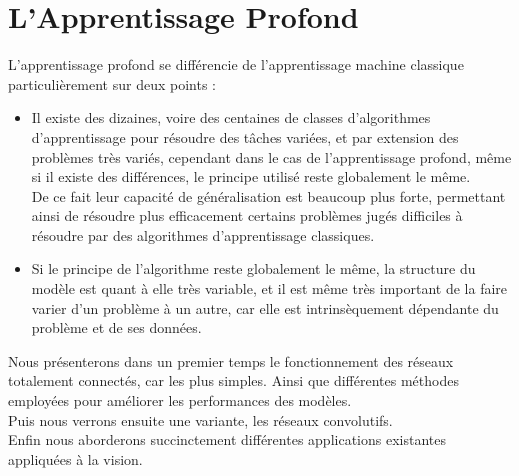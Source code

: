 \documentclass[10pt,a4paper]{report}
\begin{document}
	\chapter{L'Apprentissage Profond}
		L'apprentissage profond se différencie de l'apprentissage machine classique particulièrement sur deux points :\\
\begin{itemize}
	\item Il existe des dizaines, voire des centaines de classes d'algorithmes d'apprentissage pour résoudre des tâches variées, et par extension des problèmes très variés, cependant dans le cas de l'apprentissage profond, même si il existe des différences, le principe utilisé reste globalement le même.\\
	De ce fait leur capacité de généralisation est beaucoup plus forte, permettant ainsi de résoudre plus efficacement certains problèmes jugés difficiles à résoudre par des algorithmes d'apprentissage classiques.\\
	\item Si le principe de l'algorithme reste globalement le même, la structure du modèle est quant à elle très variable, et il est même très important de la faire varier d'un problème à un autre, car elle est intrinsèquement dépendante du problème et de ses données.\\
\end{itemize}
Nous présenterons dans un premier temps le fonctionnement des réseaux totalement connectés, car les plus simples. Ainsi que différentes méthodes employées pour améliorer les performances des modèles.\\
Puis nous verrons ensuite une variante, les réseaux convolutifs.\\
Enfin nous aborderons succinctement différentes applications existantes appliquées à la vision.
\end{document}
